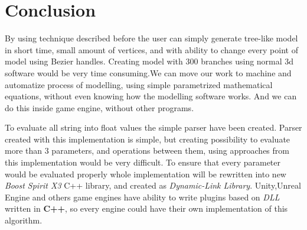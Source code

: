 \documentclass[b5paper,twoside,11pt]{article}
\begin{document}
\section{Conclusion}
By using technique described before the user can simply generate tree-like model in short time, small amount of vertices, and with ability to change every point of model using Bezier handles. Creating model with 300 branches using normal 3d  software would be very time consuming.We can move our work to machine and automatize process of modelling, using simple parametrized mathematical equations, without even knowing how the modelling software works. And we can do this inside game engine, without other programs.

To evaluate all string into float values the simple parser have been created.
Parser created with this implementation is simple, but creating possibility to evaluate more than 3 parameters, and operations between them, using approaches from this implementation would be very difficult. To ensure that every parameter would be evaluated properly whole implementation will be rewritten into new \textit{Boost Spirit X3} C++ library, and created as \textit{Dynamic-Link Library}. Unity,Unreal Engine and others game engines have ability to write plugins based on \textit{DLL} written in \textbf{C++}, so every engine could have their own implementation of this algorithm.
\end{document}
